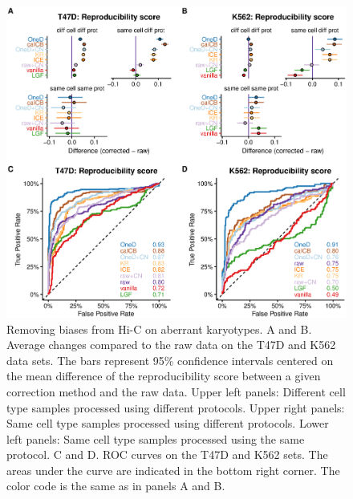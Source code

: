 \documentclass[a4,center,fleqn]{NAR}
\providecommand{\DIFadd}[1]{{\protect\color{red}#1}} %
\providecommand{\DIFdel}[1]{{\protect}}                      %
\providecommand{\DIFaddbegin}{} %
\providecommand{\DIFdelbegin}{} %
\providecommand{\DIFdelend}{} %
\providecommand{\DIFaddFL}[1]{\DIFadd{#1}} %
\begin{document}
\DIFdelbegin \DIFdel{The }\textit{\DIFdel{caICB}} %
\DIFdel{and }\textit{\DIFdel{ICE}} %
\DIFdel{methods increased the similarity
between the different cell
lines }\DIFdelend \DIFaddbegin \begin{figure}
\centerline{\includegraphics[width=.49\textwidth]
  {nar_figures/figure_2.eps}}
\caption{\DIFaddFL{Removing biases from Hi-C on aberrant karyotypes. A and B.
Average changes compared to the raw data on the T47D and K562 data sets.
The bars represent 95\% confidence intervals centered on the mean
difference of the reproducibility score between a given correction method
and the raw data. Upper left panels: Different cell type samples
processed using different protocols. Upper right panels: Same cell
type samples processed using different protocols. Lower left panels:
Same cell type samples processed using the same protocol. C and D. ROC
curves on the T47D and K562 sets. The areas under the curve are
indicated in the bottom right corner. The color code is the same as in
panels A and B.}}
\label{fig:aberrant}
\end{figure}
\end{document}
